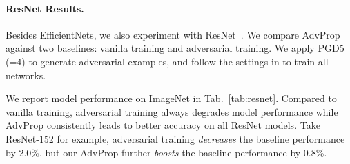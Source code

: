 \documentclass[10pt,twocolumn,letterpaper]{article}
\begin{document}
\begin{table}[h!]
\vspace{-0.5em}
\centering
{}
\vskip 0.05in
\caption{ImageNet performance when trained with different attackers. With AdvProp, all attackers successfully improve model performance over the vanilla training baseline.}
\label{tab:other_atatcker}
\end{table}


\paragraph{ResNet Results.}
Besides EfficientNets, we also experiment with ResNet~\cite{He2016}. We compare AdvProp against two baselines: vanilla training and adversarial training. We apply PGD5 (=4) to generate adversarial examples, and follow the settings in \cite{He2016} to train all networks.

We report model performance on ImageNet in Tab.~\ref{tab:resnet}. Compared to vanilla training, adversarial training always degrades model performance while AdvProp consistently leads to better accuracy on all ResNet models. 
Take ResNet-152 for example, 
adversarial training \emph{decreases} the baseline performance by 2.0\%, but our AdvProp further \emph{boosts} the baseline performance by 0.8\%.


\begin{table}[h!]
\centering
\vspace{-0.82em}
\vskip 0.02in
\caption{Performance comparison among vanilla training, adversarial training and AdvProp on ImageNet. AdvProp reports the best result on all ResNet models.}
\vspace{-0.55em}
\label{tab:resnet}
\end{table}
\end{document}
